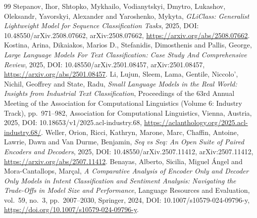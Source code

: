 \documentclass[11pt,a4paper]{article}
\begin{document}
\begin{thebibliography}{99}
 Stepanov, Ihor, Shtopko, Mykhailo, Vodianytskyi, Dmytro, Lukashov, Oleksandr, Yavorskyi, Alexander and Yaroshenko, Mykyta, \emph{{GLiClass}: Generalist Lightweight Model for Sequence Classification Tasks}, 2025, DOI: 10.48550/arXiv.2508.07662, arXiv:2508.07662, \url{https://arxiv.org/abs/2508.07662}.
 Kostina, Arina, Dikaiakos, Marios D., Stefanidis, Dimosthenis and Pallis, George, \emph{Large Language Models For Text Classification: Case Study And Comprehensive Review}, 2025, DOI: 10.48550/arXiv.2501.08457, arXiv:2501.08457, \url{https://arxiv.org/abs/2501.08457}.
 Li, Lujun, Sleem, Lama, Gentile, Niccolo', Nichil, Geoffrey and State, Radu, \emph{Small Language Models in the Real World: Insights from Industrial Text Classification}, Proceedings of the 63rd Annual Meeting of the Association for Computational Linguistics (Volume 6: Industry Track), pp.~971--982, Association for Computational Linguistics, Vienna, Austria, 2025, DOI: 10.18653/v1/2025.acl-industry.68, \url{https://aclanthology.org/2025.acl-industry.68/}.
 Weller, Orion, Ricci, Kathryn, Marone, Marc, Chaffin, Antoine, Lawrie, Dawn and Van Durme, Benjamin, \emph{Seq vs Seq: An Open Suite of Paired Encoders and Decoders}, 2025, DOI: 10.48550/arXiv.2507.11412, arXiv:2507.11412, \url{https://arxiv.org/abs/2507.11412}.
 Benayas, Alberto, Sicilia, Miguel {\'A}ngel and Mora-Cantallops, Mar{\c c}al, \emph{A Comparative Analysis of Encoder Only and Decoder Only Models in Intent Classification and Sentiment Analysis: Navigating the Trade-Offs in Model Size and Performance}, Language Resources and Evaluation, vol.~59, no.~3, pp.~2007--2030, Springer, 2024, DOI: 10.1007/s10579-024-09796-y, \url{https://doi.org/10.1007/s10579-024-09796-y}.
\end{thebibliography}
\end{document}
